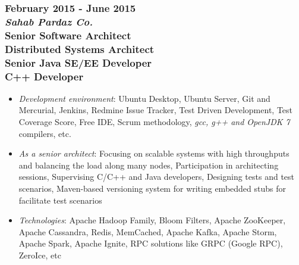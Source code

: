 \documentclass[10pt,a4paper]{article}
\begin{document}
  \setlength{\leftskip}{0pt}
  \setlength{\rightskip}{0cm}
	  
\subsubsection{\textnormal {February 2015 - June 2015} \\ \textnormal {\textit {Sahab Pardaz Co.}} \\ Senior Software Architect \\ Distributed Systems Architect \\ Senior Java SE/EE Developer \\ C++ Developer}
	\setlength{\leftskip}{0.5cm}
  \setlength{\rightskip}{1cm}
  \begin{itemize}
    \setlength{\rightskip}{1cm}
    \setlength\itemsep{0em}
    \item \small \textit {Development environment}: Ubuntu Desktop, Ubuntu Server, Git and Mercurial, Jenkins, Redmine Issue Tracker, Test Driven Development, Test Coverage Score, Free IDE, Scrum methodology, \textit {gcc, g++ and OpenJDK 7} compilers, etc.
    \item \small \textit {As a senior architect}: Focusing on scalable systems with high throughputs and balancing the load along many nodes, Participation in architecting sessions, Supervising C/C++ and Java developers, Designing tests and test scenarios, Maven-based versioning system for writing embedded stubs for facilitate test scenarios
    \item \small \textit {Technologies}: Apache Hadoop Family, Bloom Filters, Apache ZooKeeper, Apache Cassandra, Redis, MemCached, Apache Kafka, Apache Storm, Apache Spark, Apache Ignite, RPC solutions like GRPC (Google RPC), ZeroIce, etc
  \end{itemize}
  \setlength{\leftskip}{0pt}
  \setlength{\rightskip}{0cm}
	  
\end{document}
